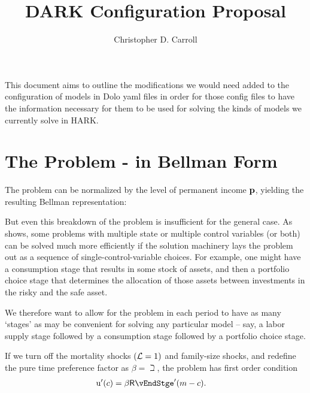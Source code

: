 \documentclass[SolvingMicroDSOPs]{subfiles}
\title{DARK Configuration Proposal}
\author{Christopher D. Carroll}
\begin{document}
\maketitle


This document aims to outline the modifications we would need added to the configuration of models in Dolo yaml files in order for those config files to have the information necessary for them to be used for solving the kinds of models we currently solve in HARK.

\providecommand{\stge}{s}
\renewcommand{\stge}{s}

\providecommand{\interval}{stage}
\renewcommand{\interval}{stage}

\section{The Problem - in Bellman Form}





The problem can be normalized by the level of permanent income $\mathbf{p}$, yielding the resulting Bellman representation:




But even this breakdown of the problem is insufficient for the general case.  As \cite{lujanEGMn} shows, some problems with multiple state or multiple control variables (or both) can be solved much more efficiently if the solution machinery lays the problem out as a sequence of single-control-variable choices.  For example, one might have a consumption stage that results in some stock of assets, and then a portfolio choice stage that determines the allocation of those assets between investments in the risky and the safe asset.

We therefore want to allow for the problem in each period to have as many `stages' as may be convenient for solving any particular model -- say, a labor supply stage followed by a consumption stage followed by a portfolio choice stage.

\renewcommand{\stge}{s}





If we turn off the mortality shocks $(\mathcal{L}=1)$ and family-size shocks, and redefine the pure time preference factor as $\beta=\beth$, the problem has first order condition
\begin{align}
   \uFunc^{\prime}(\cNrm) & = \DiscFac \Rfree \vEndStge^{\prime}(\mNrm - \cNrm).  \label{eq:FOCmove}
\end{align}
\end{document}
